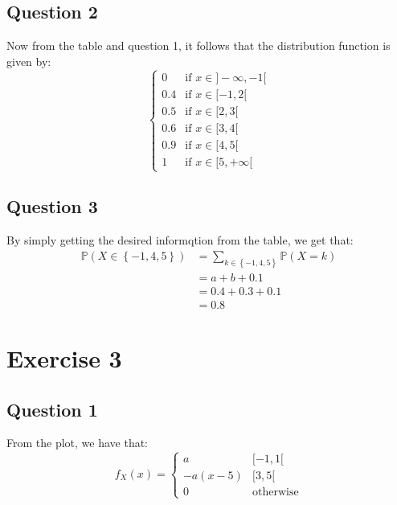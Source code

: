 \documentclass{article}
\renewcommand{\P}{\mathbb{P}}
\begin{document}
\subsection{Question 2}
Now from the table and question 1, it follows that the distribution function is given by:
\[
    \begin{cases}
        0   & \text{if } x \in ]-\infty, -1[ \\
        0.4 & \text{if } x \in [-1, 2[       \\
        0.5 & \text{if } x \in [2, 3[        \\
        0.6 & \text{if } x \in [3, 4[        \\
        0.9 & \text{if } x \in [4, 5[        \\
        1   & \text{if } x \in [5, +\infty[
    \end{cases}
\]

\subsection{Question 3}
By simply getting the desired informqtion from the table, we get that:
\begin{align*}
    \P(X \in \left\{ -1, 4, 5\right\})
     & = \sum_{k \in \left\{ -1, 4, 5\right\}} \P(X=k) \\
     & = a + b + 0.1                                   \\
     & = 0.4 + 0.3 + 0.1                               \\
     & = 0.8
\end{align*}

\section{Exercise 3}
\subsection{Question 1}
From the plot, we have that:
\begin{equation}
    \label{ex3.1: def of PDF}
    f_X(x) =
    \begin{cases}
        a       & [-1, 1[          \\
        -a(x-5) & [3, 5[           \\
        0       & \text{otherwise}
    \end{cases}
\end{equation}
\end{document}
